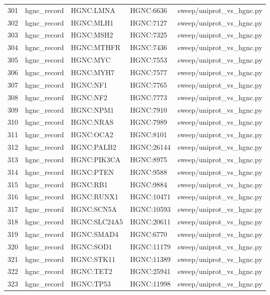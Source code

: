 {\begin{longtable}{rllp{3.2cm}p{4.2cm}}
301 & hgnc\_record & HGNC:LMNA & HGNC:6636 & sweep/uniprot\_vs\_hgnc.py\\
302 & hgnc\_record & HGNC:MLH1 & HGNC:7127 & sweep/uniprot\_vs\_hgnc.py\\
303 & hgnc\_record & HGNC:MSH2 & HGNC:7325 & sweep/uniprot\_vs\_hgnc.py\\
304 & hgnc\_record & HGNC:MTHFR & HGNC:7436 & sweep/uniprot\_vs\_hgnc.py\\
305 & hgnc\_record & HGNC:MYC & HGNC:7553 & sweep/uniprot\_vs\_hgnc.py\\
306 & hgnc\_record & HGNC:MYH7 & HGNC:7577 & sweep/uniprot\_vs\_hgnc.py\\
307 & hgnc\_record & HGNC:NF1 & HGNC:7765 & sweep/uniprot\_vs\_hgnc.py\\
308 & hgnc\_record & HGNC:NF2 & HGNC:7773 & sweep/uniprot\_vs\_hgnc.py\\
309 & hgnc\_record & HGNC:NPM1 & HGNC:7910 & sweep/uniprot\_vs\_hgnc.py\\
310 & hgnc\_record & HGNC:NRAS & HGNC:7989 & sweep/uniprot\_vs\_hgnc.py\\
311 & hgnc\_record & HGNC:OCA2 & HGNC:8101 & sweep/uniprot\_vs\_hgnc.py\\
312 & hgnc\_record & HGNC:PALB2 & HGNC:26144 & sweep/uniprot\_vs\_hgnc.py\\
313 & hgnc\_record & HGNC:PIK3CA & HGNC:8975 & sweep/uniprot\_vs\_hgnc.py\\
314 & hgnc\_record & HGNC:PTEN & HGNC:9588 & sweep/uniprot\_vs\_hgnc.py\\
315 & hgnc\_record & HGNC:RB1 & HGNC:9884 & sweep/uniprot\_vs\_hgnc.py\\
316 & hgnc\_record & HGNC:RUNX1 & HGNC:10471 & sweep/uniprot\_vs\_hgnc.py\\
317 & hgnc\_record & HGNC:SCN5A & HGNC:10593 & sweep/uniprot\_vs\_hgnc.py\\
318 & hgnc\_record & HGNC:SLC24A5 & HGNC:20611 & sweep/uniprot\_vs\_hgnc.py\\
319 & hgnc\_record & HGNC:SMAD4 & HGNC:6770 & sweep/uniprot\_vs\_hgnc.py\\
320 & hgnc\_record & HGNC:SOD1 & HGNC:11179 & sweep/uniprot\_vs\_hgnc.py\\
321 & hgnc\_record & HGNC:STK11 & HGNC:11389 & sweep/uniprot\_vs\_hgnc.py\\
322 & hgnc\_record & HGNC:TET2 & HGNC:25941 & sweep/uniprot\_vs\_hgnc.py\\
323 & hgnc\_record & HGNC:TP53 & HGNC:11998 & sweep/uniprot\_vs\_hgnc.py\\

\end{longtable}}
